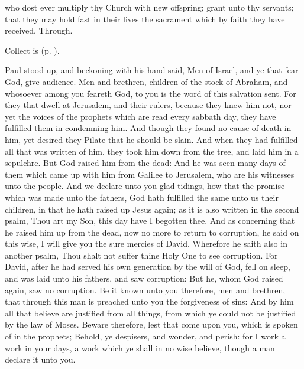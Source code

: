 \collect
 who dost ever multiply thy Church with new offspring; grant unto thy servants; that they may hold fast in their lives the sacrament which by faith they have received. Through.
\begin{rubric}
     Collect is  (p. \pageref{EasterCollect}).
\end{rubric}

 Paul stood up, and beckoning with his hand said, Men of Israel, and ye that fear God, give audience. Men and brethren, children of the stock of Abraham, and whosoever among you feareth God, to you is the word of this salvation sent. For they that dwell at Jerusalem, and their rulers, because they knew him not, nor yet the voices of the prophets which are read every sabbath day, they have fulfilled them in condemning him. And though they found no cause of death in him, yet desired they Pilate that he should be slain. And when they had fulfilled all that was written of him, they took him down from the tree, and laid him in a sepulchre. But God raised him from the dead: And he was seen many days of them which came up with him from Galilee to Jerusalem, who are his witnesses unto the people. And we declare unto you glad tidings, how that the promise which was made unto the fathers, God hath fulfilled the same unto us their children, in that he hath raised up Jesus again; as it is also written in the second psalm, Thou art my Son, this day have I begotten thee. And as concerning that he raised him up from the dead, now no more to return to corruption, he said on this wise, I will give you the sure mercies of David. Wherefore he saith also in another psalm, Thou shalt not suffer thine Holy One to see corruption. For David, after he had served his own generation by the will of God, fell on sleep, and was laid unto his fathers, and saw corruption: But he, whom God raised again, saw no corruption. Be it known unto you therefore, men and brethren, that through this man is preached unto you the forgiveness of sins: And by him all that believe are justified from all things, from which ye could not be justified by the law of Moses. Beware therefore, lest that come upon you, which is spoken of in the prophets; Behold, ye despisers, and wonder, and perish: for I work a work in your days, a work which ye shall in no wise believe, though a man declare it unto you.

